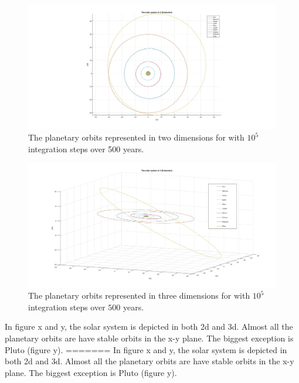 \documentclass[10pt,a4paper]{article}
\begin{document}
\begin{figure} [H]  
\centerline{\includegraphics[scale=0.40]{2dsolsys.jpg}}
\caption{The planetary orbits represented in two dimensions for with $10^5$ integration steps over 500 years.}
\end{figure}



\begin{figure} [H]

\centerline{\includegraphics[scale=0.35]{3dsolsys.jpg}}
\caption{The planetary orbits represented in three dimensions for with $10^5$ integration steps over $500$ years.}

\end{figure}

In figure x and y, the solar system is depicted in both 2d and 3d. Almost all the planetary orbits are have stable orbits in the x-y plane. The biggest exception is Pluto (figure y). 
=======
In figure x and y, the solar system is depicted in both 2d and 3d. Almost all the planetary orbits are have stable orbits in the x-y plane. The biggest exception is Pluto (figure y).
\end{document}
